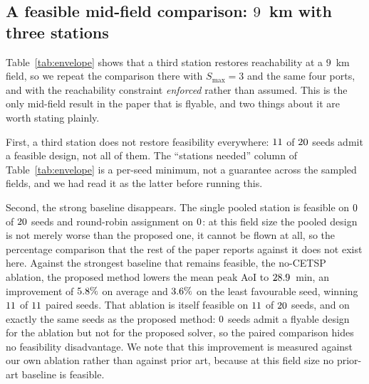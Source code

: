 \begin{table}[t]
  \centering
  \caption{Where the recharge-reachability constraint \eqref{eq:P0e2} can be met, for
  $S_{\max}{=}2$ stations and a one-way budget of $\rReachKm$\,km. ``Stations needed''
  is a \emph{per-seed minimum}: the smallest number of open stations that restores
  feasibility on a given seed, not a count that guarantees feasibility across the
  sampled fields. Section~\ref{sec:ninekm} measures the difference.}
  \label{tab:envelope}
  
\end{table}

\subsection{A feasible mid-field comparison: $9$~km with three stations}
\label{sec:ninekm}
Table~\ref{tab:envelope} shows that a third station restores reachability at a $9$~km
field, so we repeat the comparison there with $S_{\max}{=}3$ and the same four ports, and
with the reachability constraint \emph{enforced} rather than assumed. This is the only
mid-field result in the paper that is flyable, and two things about it are worth stating
plainly.

First, a third station does not restore feasibility everywhere: $11$ of
$20$ seeds admit a feasible design, not all of them. The ``stations needed''
column of Table~\ref{tab:envelope} is a per-seed minimum, not a guarantee across the
sampled fields, and we had read it as the latter before running this.

Second, the strong baseline disappears. The single pooled station is feasible on
$0$ of $20$ seeds and round-robin assignment on
$0$: at this field size the pooled design is not merely worse than the
proposed one, it cannot be flown at all, so the percentage comparison that the rest of
the paper reports against it does not exist here. Against the strongest baseline that
remains feasible, the no-CETSP ablation, the proposed method lowers the mean peak AoI to
$28.9$~min, an improvement of $5.8\%$ on average and $3.6\%$ on the
least favourable seed, winning $11$ of $11$ paired seeds. That ablation
is itself feasible on $11$ of $20$ seeds, and on exactly the same
seeds as the proposed method: $0$ seeds admit a flyable design for the
ablation but not for the proposed solver, so the paired comparison hides no feasibility
disadvantage. We note that this improvement is measured against our own ablation rather
than against prior art, because at this field size no prior-art baseline is feasible.

